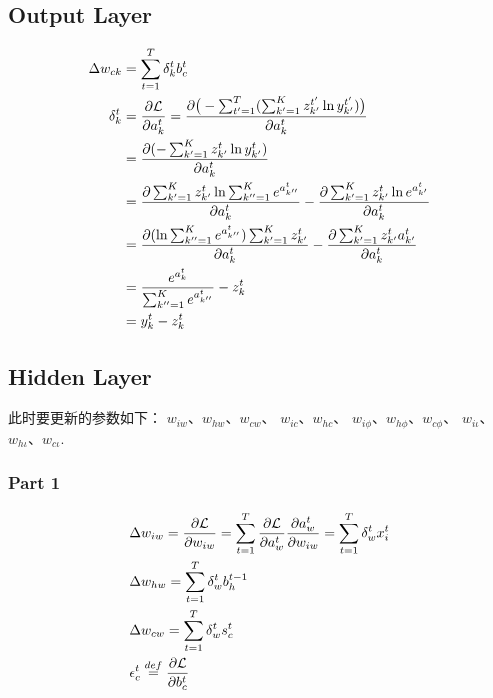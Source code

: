 \documentclass[a4paper,11pt,titlepage,UTF8]{article}
\begin{document}
        \subsection{Output Layer}
        \begin{align}
         \Delta w_{ck} &= \sum_{t=1}^T \delta_k^t b_c^t \\
         \delta_k^t
            &= \frac{\partial \mathcal{L}}{\partial a_k^t} \notag
            = \frac{\partial \big(-\sum_{t'=1}^T(\sum_{k'=1}^K z_{k'}^{t'} \ln y_{k'}^{t'})\big)}{\partial a_k^t} \notag\\
            &= \frac{\partial (-\sum_{k'=1}^K z_{k'}^{t} \ln y_{k'}^{t})}{\partial a_k^t} \notag\\
            &= \frac{\partial \sum_{k'=1}^K z_{k'}^{t} \ln \sum_{k''=1}^K e^{a_{k''}^t}}{\partial a_k^t}
            - \frac{\partial \sum_{k'=1}^K z_{k'}^{t} \ln e^{a_{k'}^t}}{\partial a_k^t} \notag \\
            &= \frac{\partial ( \ln \sum_{k''=1}^K e^{a_{k''}^t}) \sum_{k'=1}^K z_{k'}^{t} }{\partial a_k^t}
            - \frac{\partial \sum_{k'=1}^K z_{k'}^{t} a_{k'}^t}{\partial a_k^t} \notag \\
            &= \frac{e^{a_k^t}}{\sum_{k''=1}^K e^{a_{k''}^t}} - z_k^t \notag \\
            &= y_k^t - z_k^t
        \end{align}

        \subsection{Hidden Layer}

        此时要更新的参数如下：
        $w_{iw}$、$w_{hw}$、$w_{cw}$、
        $w_{ic}$、$w_{hc}$、
        $w_{i\phi}$、$w_{h\phi}$、$w_{c\phi}$、
        $w_{i\iota}$、$w_{h\iota}$、$w_{c\iota}$.

        \subsubsection{Part 1}
        \begin{align}
        & \Delta w_{iw} = \frac{\partial \mathcal{L}}{\partial w_{iw}}
        = \sum_{t=1}^T \frac{\partial \mathcal{L}}{\partial a_w^t}\frac{\partial a_w^t}{\partial w_{iw}}
        = \sum_{t=1}^T \delta_w^t x_i^t \notag \\
        & \Delta w_{hw} = \sum_{t=1}^T \delta_w^t b_h^{t-1} \notag \\
        & \Delta w_{cw} = \sum_{t=1}^T \delta_w^t s_c^t \notag \\
        & \epsilon_c^t\stackrel{def}{=} \frac{\partial \mathcal{L}}{\partial b_c^t} \notag
        \end{align}
\end{document}
